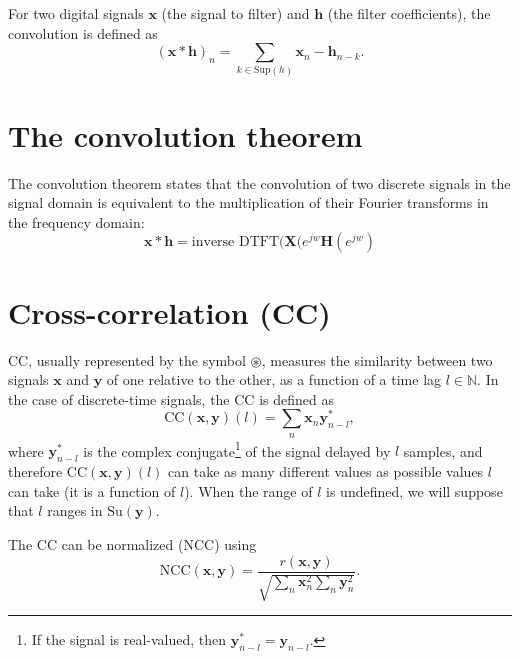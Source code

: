 For two digital signals $\mathbf{x}$ (the signal to filter) and
$\mathbf{h}$ (the filter coefficients), the convolution is defined as
\begin{equation}
(\mathbf{x}\ast\mathbf{h})_{n}=\sum_{k\in\text{Sup}(h)}\mathbf{x}_n-\mathbf{h}_{n-k}.
\label{eq:convolution}
\end{equation}


\section{The convolution theorem}
\label{sec:convolution_theorem}
The convolution theorem states that the convolution of two discrete signals in
the signal domain is equivalent to the multiplication of their Fourier
transforms in the frequency domain:
\begin{equation}
  \mathbf{x}\ast\mathbf{h} = \text{inverse~DTFT}(\mathbf{X}(e^{jw}\mathbf{H}(e^{jw}) 
\end{equation}

\section{Cross-correlation (CC)}
\label{sec:cross-correlation}

\gls{CC}, usually represented by the symbol $\circledast$, measures
the similarity between two signals $\mathbf{x}$ and $\mathbf{y}$ of
one relative to the other, as a function of a time lag
$l\in\mathbb{N}$. In the case of discrete-time signals, the \gls{CC}
is defined as
\begin{equation}
  {\text{CC}(\mathbf{x},\mathbf{y})}(l)=\sum_n{\mathbf{x}}_n \mathbf{y}^*_{n-l},
\end{equation}
where $\mathbf{y}^* _{n-l}$ is the complex conjugate\footnote{If the
  signal is real-valued, then $\mathbf{y}^*_{n-l}=\mathbf{y}_{n-l}$.}
of the signal delayed by $l$ samples, and therefore
${\text{CC}(\mathbf{x},\mathbf{y})}(l)$ can take as many different
values as possible values $l$ can take (it is a function of $l$).
When the range of $l$ is undefined, we will suppose that $l$ ranges in
$\text{Su}(\mathbf{\mathbf{y}})$.

The \gls{CC} can be normalized (\gls{NCC}) using
\begin{equation}
  \text{NCC}(\mathbf{x},\mathbf{y})=\frac{{r(\mathbf{x},\mathbf{y})}}{\sqrt{\sum_n \mathbf{x}_n^2 \sum_n \mathbf{y}_n^2}}.
\end{equation}

